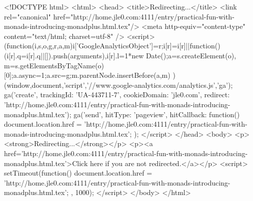 <!DOCTYPE html>
<html>
<head>
<title>Redirecting...</title>
<link rel="canonical" href="http://home.jle0.com:4111/entry/practical-fun-with-monads-introducing-monadplus.html.tex"/>
<meta http-equiv="content-type" content="text/html; charset=utf-8" />
<script>
(function(i,s,o,g,r,a,m){i['GoogleAnalyticsObject']=r;i[r]=i[r]||function(){
(i[r].q=i[r].q||[]).push(arguments)},i[r].l=1*new Date();a=s.createElement(o),
m=s.getElementsByTagName(o)[0];a.async=1;a.src=g;m.parentNode.insertBefore(a,m)
})(window,document,'script','//www.google-analytics.com/analytics.js','ga');
ga('create', { trackingId: 'UA-443711-7', cookieDomain: 'jle0.com', redirect: 'http://home.jle0.com:4111/entry/practical-fun-with-monads-introducing-monadplus.html.tex'});
ga('send', { hitType: 'pageview', hitCallback: function() { document.location.href = 'http://home.jle0.com:4111/entry/practical-fun-with-monads-introducing-monadplus.html.tex'; } });
</script>
</head>
<body>
  <p><strong>Redirecting...</strong></p>
  <p><a href='http://home.jle0.com:4111/entry/practical-fun-with-monads-introducing-monadplus.html.tex'>Click here if you are not redirected.</a></p>
  <script>
    setTimeout(function() { document.location.href = 'http://home.jle0.com:4111/entry/practical-fun-with-monads-introducing-monadplus.html.tex'; }, 1000);
  </script>
</body>
</html>
